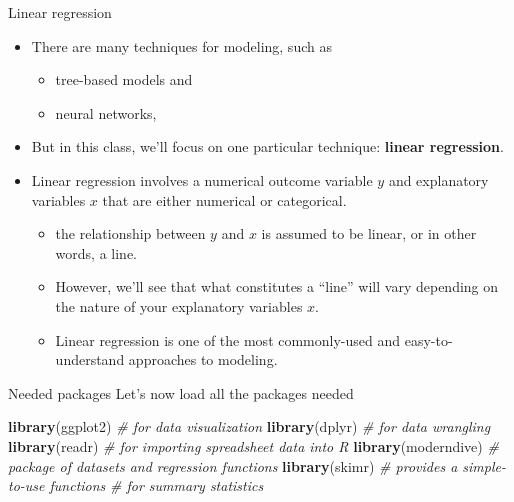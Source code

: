 \documentclass[
  ignorenonframetext,
]{beamer}
\newenvironment{Shaded}{\begin{snugshade}}{\end{snugshade}}
\newcommand{\CommentTok}[1]{\textcolor[rgb]{0.56,0.35,0.01}{\textit{#1}}}
\newcommand{\FunctionTok}[1]{\textcolor[rgb]{0.13,0.29,0.53}{\textbf{#1}}}
\newcommand{\NormalTok}[1]{#1}
\providecommand{\tightlist}{%
  \setlength{\itemsep}{0pt}\setlength{\parskip}{0pt}}
\begin{document}
\begin{frame}{Linear regression}
\protect\hypertarget{linear-regression}{}
\begin{itemize}
\item
  There are many techniques for modeling, such as

  \begin{itemize}
  \tightlist
  \item
    tree-based models and
  \item
    neural networks,
  \end{itemize}
\item
  But in this class, we'll focus on one particular technique:
  \textbf{linear regression}.
\item
  Linear regression involves a numerical outcome variable \(y\) and
  explanatory variables \(x\) that are either numerical or categorical.

  \begin{itemize}
  \tightlist
  \item
    the relationship between \(y\) and \(x\) is assumed to be linear, or
    in other words, a line.
  \item
    However, we'll see that what constitutes a ``line'' will vary
    depending on the nature of your explanatory variables \(x\).
  \item
    Linear regression is one of the most commonly-used and
    easy-to-understand approaches to modeling.
  \end{itemize}
\end{itemize}
\end{frame}

\begin{frame}[fragile]{Needed packages}
\protect\hypertarget{needed-packages}{}
Let's now load all the packages needed

\small

\begin{Shaded}
\begin{Highlighting}[]
\FunctionTok{library}\NormalTok{(ggplot2)  }\CommentTok{\#  for data visualization}
\FunctionTok{library}\NormalTok{(dplyr)    }\CommentTok{\#  for data wrangling}
\FunctionTok{library}\NormalTok{(readr)    }\CommentTok{\# for importing spreadsheet data into R}
\FunctionTok{library}\NormalTok{(moderndive) }\CommentTok{\# package of datasets and regression functions}
\FunctionTok{library}\NormalTok{(skimr)      }\CommentTok{\# provides a simple{-}to{-}use functions }
                    \CommentTok{\# for summary statistics}
\end{Highlighting}
\end{Shaded}

\normalsize
\end{frame}
\end{document}
